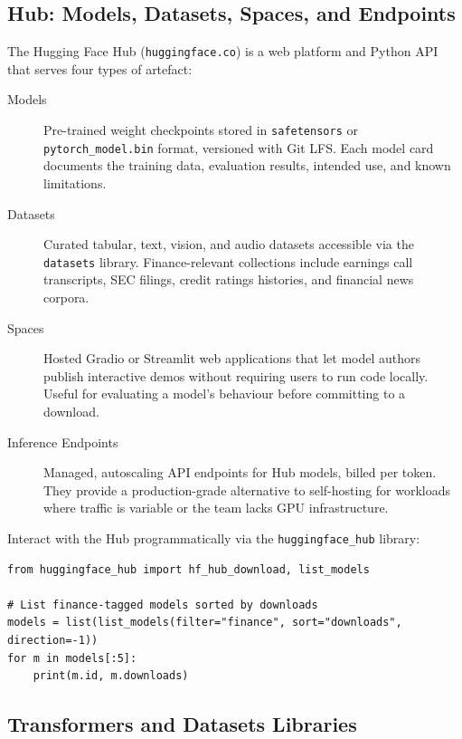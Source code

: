 \subsection{Hub: Models, Datasets, Spaces, and Endpoints}
\label{app:hf:hub}

The Hugging Face Hub (\texttt{huggingface.co}) is a web platform and Python
API that serves four types of artefact:

\begin{description}
  \item[Models] Pre-trained weight checkpoints stored in \texttt{safetensors}
        or \texttt{pytorch\_model.bin} format, versioned with Git LFS.  Each
        model card documents the training data, evaluation results, intended
        use, and known limitations.

  \item[Datasets] Curated tabular, text, vision, and audio datasets accessible
        via the \texttt{datasets} library.  Finance-relevant collections include
        earnings call transcripts, SEC filings, credit ratings histories, and
        financial news corpora.

  \item[Spaces] Hosted Gradio or Streamlit web applications that let model
        authors publish interactive demos without requiring users to run code
        locally.  Useful for evaluating a model's behaviour before committing
        to a download.

  \item[Inference Endpoints] Managed, autoscaling API endpoints for Hub models,
        billed per token.  They provide a production-grade alternative to
        self-hosting for workloads where traffic is variable or the team lacks
        GPU infrastructure.
\end{description}

Interact with the Hub programmatically via the \texttt{huggingface\_hub}
library:

\begin{verbatim}
from huggingface_hub import hf_hub_download, list_models

# List finance-tagged models sorted by downloads
models = list(list_models(filter="finance", sort="downloads", direction=-1))
for m in models[:5]:
    print(m.id, m.downloads)
\end{verbatim}

\subsection{Transformers and Datasets Libraries}
\label{app:hf:libraries}

